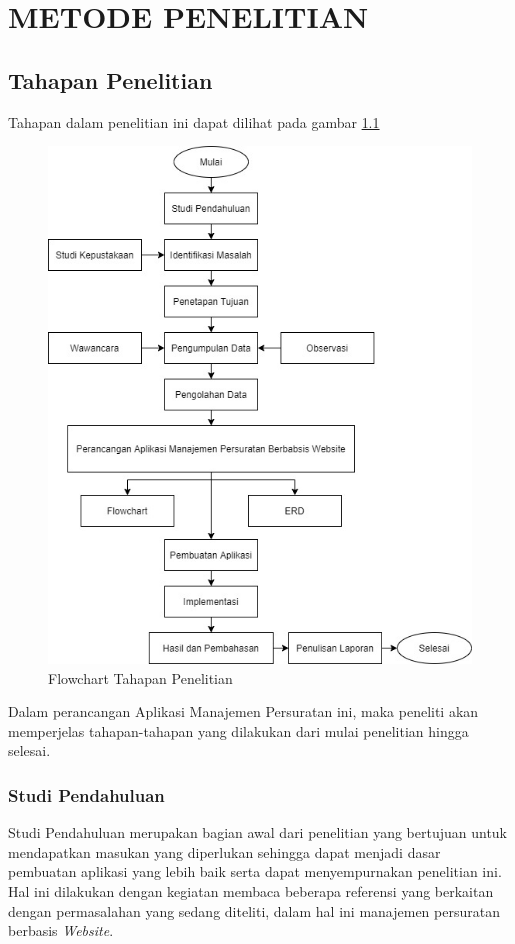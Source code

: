 \chapter{METODE PENELITIAN}

\section{Tahapan Penelitian}

Tahapan dalam penelitian ini dapat dilihat pada gambar \ref{pict}

\begin{figure}[H]
    \includegraphics[width=0.8\linewidth, center]{images/flowchart-penelitian.jpg}
    \caption{Flowchart Tahapan Penelitian}
    \label{pict}
\end{figure}

Dalam perancangan Aplikasi Manajemen Persuratan ini, maka peneliti akan memperjelas tahapan-tahapan yang dilakukan dari mulai penelitian hingga selesai.

\subsection{Studi Pendahuluan}

Studi Pendahuluan merupakan bagian awal dari penelitian yang bertujuan untuk mendapatkan masukan yang diperlukan sehingga dapat menjadi dasar pembuatan aplikasi yang lebih baik serta dapat menyempurnakan penelitian ini. Hal ini dilakukan dengan kegiatan membaca beberapa referensi yang berkaitan dengan permasalahan yang sedang diteliti, dalam hal ini manajemen persuratan berbasis \textit{Website}.

